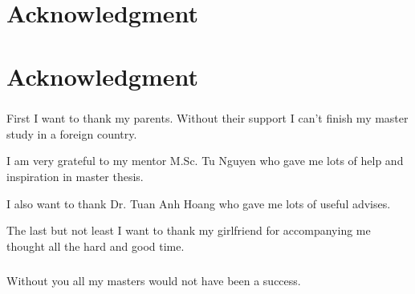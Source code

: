 \chapter{Acknowledgment}

\paragraph{} %
\label{par:}
\chapter{Acknowledgment}

\paragraph{} %
\label{par:}
First I want to thank my parents. Without their support I can't finish my master study in a foreign country. 
 
I am very grateful to my mentor M.Sc. Tu Nguyen who gave me lots of help and inspiration in master thesis.   

I also want to thank Dr. Tuan Anh Hoang who gave me lots of useful advises.

The last but not least I want to thank my girlfriend for accompanying me thought all the hard and good time. 
\paragraph{}

Without you all my masters would not have been a success. 



\paragraph{}


